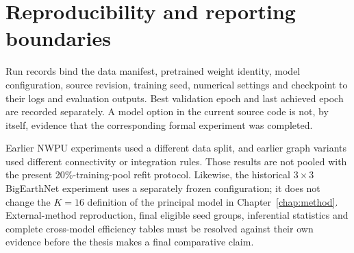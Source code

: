 \section{Reproducibility and reporting boundaries}

Run records bind the data manifest, pretrained weight identity, model
configuration, source revision, training seed, numerical settings and
checkpoint to their logs and evaluation outputs. Best validation epoch and
last achieved epoch are recorded separately. A model option in the current
source code is not, by itself, evidence that the corresponding formal
experiment was completed.

Earlier NWPU experiments used a different data split, and earlier graph
variants used different connectivity or integration rules. Those results
are not pooled with the present 20\%-training-pool refit protocol. Likewise,
the historical $3\times3$ BigEarthNet experiment uses a separately frozen
configuration; it does not change the $K=16$ definition of the principal
model in Chapter~\ref{chap:method}. External-method reproduction, final
eligible seed groups, inferential statistics and complete cross-model
efficiency tables must be resolved against their own evidence before the
thesis makes a final comparative claim.
